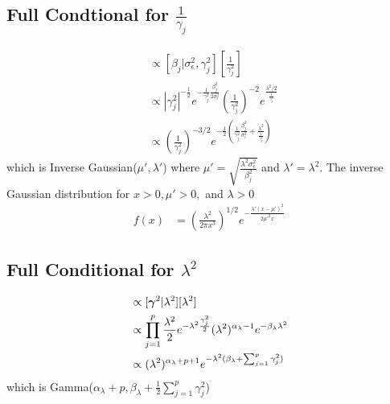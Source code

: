 \documentclass[fleqn]{article}
\def\bm#1{\mbox{\boldmath $#1$}}
\begin{document}
\subsection{Full Condtional for $\frac{1} {\gamma_j}$}
%
\begin{align*}
[ \frac{1} {\gamma^2_j} | \cdot ] & \propto [\beta_j | \sigma^2_\epsilon, \gamma^2_j] [\frac{1} {\gamma^2_j}]\\
%
& \propto | \gamma^2_j |^{ - \frac{1} {2}} e^{ - \frac{1} {\gamma^2_j} \frac{\beta^2_j} {2 \sigma^2_\epsilon}} ( \frac{1} {\gamma^2_j} )^{ - 2} e^{\frac{\lambda^2 / 2}{\frac{1} {\gamma^2_j}}}\\
& \propto (\frac{1} {\gamma^2_j})^{ - 3 / 2} e^{-\frac{1} {2} (\frac{1} {\gamma^2_j} \frac{\beta^2_j} {\sigma^2_\epsilon} + \frac{\lambda^2} {\frac{1} {\gamma^2_j}})}
\end{align*}
which is Inverse Gaussian($\mu', \lambda'$) where $\mu' = \sqrt{\frac{\lambda^2 \sigma^2_\epsilon} {\beta^2_j}}$ and $\lambda' = \lambda^2$. The inverse Gaussian distribution for $x > 0, \mu' > 0,$ and $\lambda > 0$
%
\begin{align*}
f(x) & = (\frac{\lambda^2} {2 \pi x^3})^{1 / 2} e^{ - \frac{\lambda'(x - \mu')^2} {2 \mu'^2 x}}
\end{align*}
%
\subsection{Full Conditional for $\lambda^2$}
%
\begin{align*}
[\lambda^2 | \cdot] & \propto [\bm{\gamma}^2 | \lambda^2] [\lambda^2]\\
%
& \propto \prod_{j = 1}^p \frac{\lambda^2} {2} e^{ - \lambda^2 \frac{\gamma^2_j} {2}} (\lambda^2)^{\alpha_\lambda - 1} e^{ - \beta_\lambda \lambda^2}\\
%
& \propto (\lambda^2)^{\alpha_\lambda + p + 1} e^{ - \lambda^2 (\beta_\lambda + \sum_{j = 1}^p \gamma^2_j)}
\end{align*}
%
which is Gamma($\alpha_\lambda + p, \beta_\lambda + \frac{1} {2} \sum_{j = 1}^p \gamma^2_j$)
%
\end{document}
